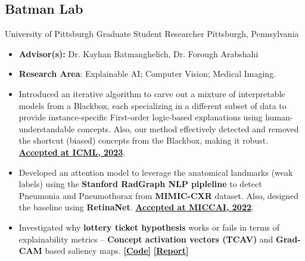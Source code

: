 \documentclass[11pt,letter,sans]{moderncv}
\begin{document}
    \subsection{Batman Lab}
      {University of Pittsburgh}%
      {Graduate Student Researcher}%
      {Pittsburgh, Pennsylvania}%
      {}%
      {
        \begin{itemize}
        \item {\bf Advisor(s):} Dr. Kayhan Batmanghelich, Dr. Forough Arabshahi \item {\bf Research Area}: Explainable AI; Computer Vision; Medical Imaging.
        \item Introduced an iterative algorithm to carve out a mixture of interpretable models from a Blackbox, each specializing in a different subset of data to provide instance-specific First-order logic-based explanations using human-understandable concepts. Also, our method effectively detected and removed the shortcut (biased) concepts from the Blackbox, making it robust. \href{https://shantanu48114860.github.io/projects/ICML-2023-MoIE/}
        {\textbf{Accepted at ICML, 2023}}.
        \item Developed an attention model to leverage the anatomical landmarks (weak labels) using the \textbf{Stanford RadGraph NLP pipleline} to detect Pneumonia and Pneumothorax from \textbf{MIMIC-CXR} dataset. Also, designed the baseline using \textbf{RetinaNet}.
        \href{https://conferences.miccai.org/2022/papers/045-Paper1726.html}
        {\textbf{Accepted at MICCAI, 2022}}.
        \item Investigated why \textbf{lottery ticket hypothesis} works or fails in terms of explainability metrics -- \textbf{Concept activation vectors (TCAV)} and  \textbf{Grad-CAM} based saliency maps. 
        \href{https://github.com/Shantanu48114860/Explainability-with-LTH}
        {\textbf{[Code]}} \href{https://github.com/Shantanu48114860/Explainability-with-LTH/blob/main/doc/VLR.pdf}
        {\textbf{[Report]}}
        \end{itemize} 
      }

  
\end{document}
